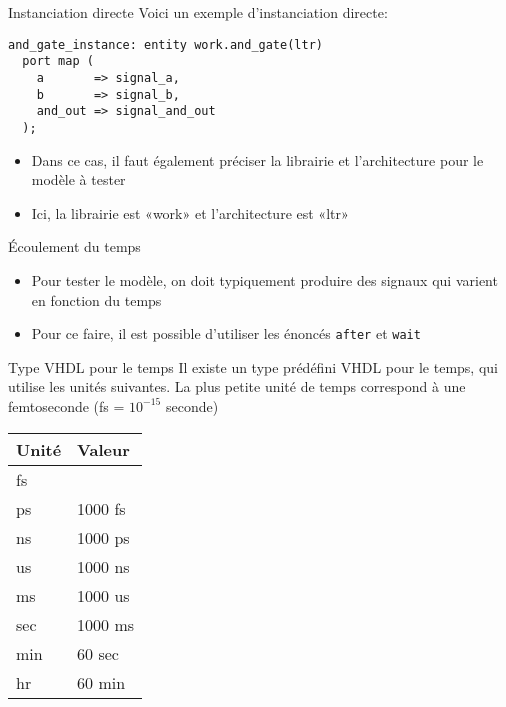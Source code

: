 \documentclass[presentation]{beamer}
\begin{document}
\begin{frame}[label={sec:org2ea6b4e},fragile]{Instanciation directe}
 Voici un exemple d'instanciation directe:

\begin{verbatim}
and_gate_instance: entity work.and_gate(ltr)
  port map (
    a       => signal_a,
    b       => signal_b,
    and_out => signal_and_out
  );
\end{verbatim}

\begin{itemize}
\item Dans ce cas, il faut également préciser la librairie et l'architecture pour le modèle à tester
\item Ici, la librairie est «work» et l'architecture est «ltr»
\end{itemize}
\end{frame}

\begin{frame}[label={sec:orgebd77d6},fragile]{Écoulement du temps}
 \begin{itemize}
\item Pour tester le modèle, on doit typiquement produire des signaux qui varient en fonction du temps
\item Pour ce faire, il est possible d'utiliser les énoncés \texttt{after} et \texttt{wait}
\end{itemize}
\end{frame}

\begin{frame}[label={sec:orge37602b}]{Type VHDL pour le temps}
Il existe un type prédéfini VHDL pour le temps, qui utilise les unités suivantes.  La plus petite unité de temps correspond à une femtoseconde (fs = \(10^{-15}\) seconde)

\begin{table}[htbp]
\label{tab:org4819039}
\centering
\begin{tabular}{ll}
Unité & Valeur\\[0pt]
\hline
fs & \\[0pt]
ps & 1000 fs\\[0pt]
ns & 1000 ps\\[0pt]
us & 1000 ns\\[0pt]
ms & 1000 us\\[0pt]
sec & 1000 ms\\[0pt]
min & 60 sec\\[0pt]
hr & 60 min\\[0pt]
\end{tabular}
\end{table}
\end{frame}
\end{document}
